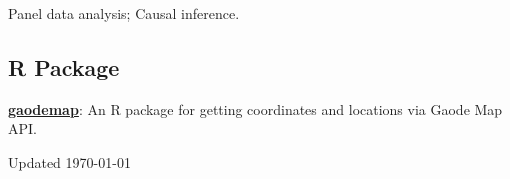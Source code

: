 \documentclass[12pt,letterpaper]{report}
\newcommand{\listitemspace}{0.15em}
\renewenvironment{itemize}
{\begin{list}{}{\setlength{\leftmargin}{0em}
            \setlength{\parskip}{0em}
            \setlength{\itemsep}{\listitemspace}
            \setlength{\parsep}{\listitemspace}}}
    {\end{list}}
\begin{document}
    \begin{itemize}

        \item Panel data analysis; Causal inference.

    \end{itemize}

    \subsection*{R Package}
    \begin{itemize}

 	\item \href{https://github.com/xiaojunlin/gaodemap}{\textbf{gaodemap}}: An R package for getting coordinates and locations via Gaode Map API. 

    \end{itemize}

    \begin{center}
        \vfill
        Updated \monthyeardate\today
    \end{center}
\end{document}
